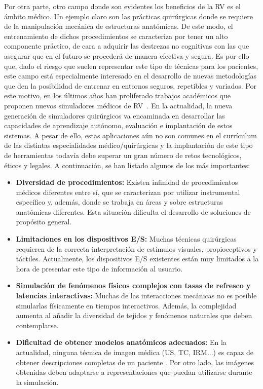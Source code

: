 Por otra parte, otro campo donde son evidentes los beneficios de la \ac{RV} es  el ámbito médico. Un ejemplo claro son las prácticas quirúrgicas donde se requiere de la manipulación mecánica de estructuras anatómicas. De este modo, el entrenamiento de dichos procedimientos se caracteriza por tener un alto componente práctico, de cara a adquirir las destrezas no cognitivas con las que asegurar que en el futuro se procederá de manera efectiva y segura.
Es por ello que, dado el riesgo que suelen representar este tipo de técnicas para los pacientes, este campo está especialmente interesado en el desarrollo de nuevas metodologías que den la posibilidad de entrenar en entornos seguros, repetibles y variados. Por este motivo, en los últimos años han proliferado trabajos académicos que proponen nuevos simuladores médicos de \ac{RV}~\cite{korzeniowski2018vcsim3,cecil2017advanced}. En la actualidad, la nueva generación de simuladores quirúrgicos va encaminada en desarrollar las capacidades de aprendizaje autónomo, evaluación e implantación de estos sistemas. A pesar de ello, estas aplicaciones aún no son comunes en el currículum de las distintas especialidades médico/quirúrgicas y la implantación de este tipo de herramientas todavía debe superar un gran número de retos tecnológicos, éticos y legales. A continuación, se han listado algunos de los más importantes:
\begin{itemize}
    \item \textbf{Diversidad de procedimientos:} Existen infinidad de procedimientos médicos diferentes entre sí, que se caracterizan por utilizar instrumental específico y, además, donde se trabaja en áreas y sobre estructuras anatómicas diferentes. Esta situación dificulta el desarrollo de soluciones de propósito general.
    \item \textbf{Limitaciones en los dispositivos \ac{E/S}:} Muchas técnicas quirúrgicas requieren de la correcta interpretación de estímulos visuales,  propioceptivos y táctiles. Actualmente, los dispositivos E/S existentes están muy limitados a la hora de presentar este tipo de información al usuario. 
    \item \textbf{Simulación de fenómenos físicos complejos con tasas de refresco y latencias interactivas:} Muchas de las interacciones mecánicas no es posible simularlas físicamente en tiempos interactivos. Además, la complejidad aumenta al añadir la diversidad de tejidos y fenómenos naturales que deben contemplarse. 
    \item \textbf{Dificultad de obtener modelos anatómicos adecuados:} En la actualidad, ninguna técnica de imagen médica (\ac{US}, \ac{TC}, \ac{IRM}...) es capaz de obtener descripciones completas de un paciente . Por otro lado, las imágenes obtenidas deben adaptarse a representaciones que puedan utilizarse durante la simulación.
\end{itemize}
